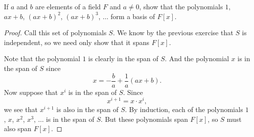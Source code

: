  If $a$ and $b$ are elements of a field $F$ and $a\neq0$,
show that the polynomials $1$, $ax+b$, $(ax+b)^2$, $(ax+b)^3$, $\dots$
form a basis of $F[x]$.
\begin{proof}
  Call this set of polynomials $S$. We know by the previous exercise
  that $S$ is independent, so we need only show that it spans
  $F[x]$.

  Note that the polynomial $1$ is clearly in the span of $S$. And the
  polynomial $x$ is in the span of $S$ since
  \begin{equation*}
    x = -\frac{b}a + \frac1a(ax+b).
  \end{equation*}
  Now suppose that $x^i$ is in the span of $S$. Since
  \begin{equation*}
    x^{i+1} = x\cdot x^i,
  \end{equation*}
  we see that $x^{i+1}$ is also in the span of $S$. By induction, each
  of the polynomials $1$, $x$, $x^2$, $x^3$, $\dots$ is in the span of
  $S$. But these polynomials span $F[x]$, so $S$ must also span
  $F[x]$.
\end{proof}
